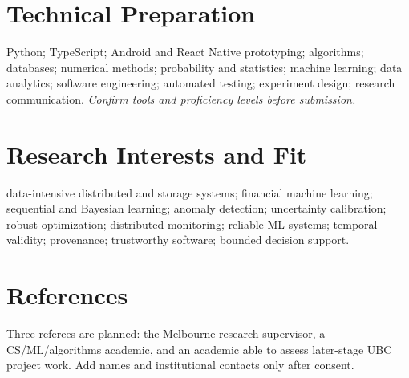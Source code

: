 \documentclass[11pt]{article}
\begin{document}
\section*{Technical Preparation}
Python; TypeScript; Android and React Native prototyping; algorithms; databases; numerical methods; probability and statistics; machine learning; data analytics; software engineering; automated testing; experiment design; research communication. \textit{Confirm tools and proficiency levels before submission.}

\section*{Research Interests and Fit}
data-intensive distributed and storage systems; financial machine learning; sequential and Bayesian learning; anomaly detection; uncertainty calibration; robust optimization; distributed monitoring; reliable ML systems; temporal validity; provenance; trustworthy software; bounded decision support.

\section*{References}
Three referees are planned: the Melbourne research supervisor, a CS/ML/algorithms academic, and an academic able to assess later-stage UBC project work. Add names and institutional contacts only after consent.
\end{document}
